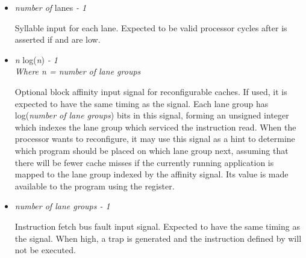 \begin{itemize}
\vspace{1em}
\item {}\textit{number of} lanes \textit{- 1}

Syllable input for each lane. Expected to be valid  processor cycles 
after  is asserted if  and 
 are low.

\vspace{1em}
\item {}\textit{n} log(\textit{n}) \textit{- 1}\\
\textit{Where n = number of lane groups}

Optional block affinity input signal for reconfigurable caches. If used, it is 
expected to have the same timing as the  signal. Each lane 
group has log(\textit{number of lane groups}) bits in this signal, forming an 
unsigned integer which indexes the lane group which serviced the instruction 
read. When the processor wants to reconfigure, it may use this signal as a hint 
to determine which program should be placed on which lane group next, assuming 
that there will be fewer cache misses if the currently running application is 
mapped to the lane group indexed by the affinity signal. Its value is made
available to the program using the  register.

\vspace{1em}
\item {}\textit{number of lane groups - 1}

Instruction fetch bus fault input signal. Expected to have the same timing as the 
 signal. When high, a  trap is generated 
and the instruction defined by  will not be executed.

\end{itemize}

